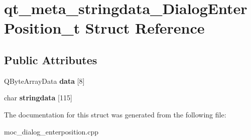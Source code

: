 \hypertarget{structqt__meta__stringdata__DialogEnterPosition__t}{\section{qt\-\_\-meta\-\_\-stringdata\-\_\-\-Dialog\-Enter\-Position\-\_\-t Struct Reference}
\label{structqt__meta__stringdata__DialogEnterPosition__t}
}
\subsection*{Public Attributes}
\begin{DoxyCompactItemize}
\item 
\hypertarget{structqt__meta__stringdata__DialogEnterPosition__t_a386df616e096727f076e2bf6b252091c}{Q\-Byte\-Array\-Data {\bfseries data} \mbox{[}8\mbox{]}}\label{structqt__meta__stringdata__DialogEnterPosition__t_a386df616e096727f076e2bf6b252091c}

\item 
\hypertarget{structqt__meta__stringdata__DialogEnterPosition__t_a2a6dcad18ede366d23c7a11c545e2f5a}{char {\bfseries stringdata} \mbox{[}115\mbox{]}}\label{structqt__meta__stringdata__DialogEnterPosition__t_a2a6dcad18ede366d23c7a11c545e2f5a}

\end{DoxyCompactItemize}


The documentation for this struct was generated from the following file\-:\begin{DoxyCompactItemize}
\item 
moc\-\_\-dialog\-\_\-enterposition.\-cpp\end{DoxyCompactItemize}
